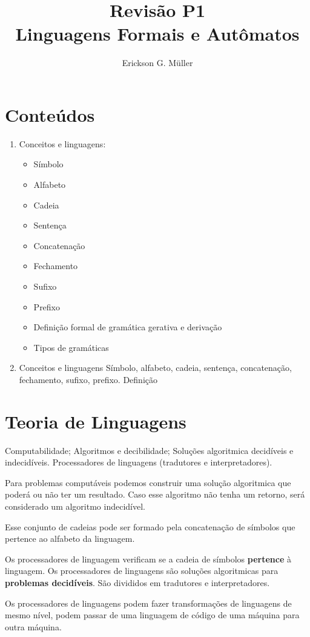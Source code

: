 \documentclass[]{article}
\title{Revisão P1\\Linguagens Formais e Autômatos}
\author{Erickson G. Müller}
\date{}
\begin{document}
	\maketitle
	\section{Conteúdos}
		\begin{enumerate}
			\item Conceitos e linguagens: 
			\begin{itemize}
				\item Símbolo
				\item Alfabeto
				\item Cadeia
				\item Sentença 
				\item Concatenação
				\item Fechamento 
				\item Sufixo
				\item Prefixo
				\item Definição formal de gramática gerativa e derivação
				\item Tipos de gramáticas
			\end{itemize}
			\item Conceitos e linguagens
				Símbolo, alfabeto, cadeia, sentença, concatenação, fechamento, sufixo, prefixo. Definição
		\end{enumerate}
	\section{Teoria de Linguagens}
		Computabilidade; Algoritmos e decibilidade; Soluções algoritmica decidíveis e indecidíveis. Processadores de linguagens (tradutores e interpretadores).
		
		Para problemas computáveis podemos construir uma solução algoritmica que poderá ou não ter um resultado. Caso esse algoritmo não tenha um retorno, será considerado um algoritmo indecidível.
		
		Esse conjunto de cadeias pode ser formado pela concatenação de símbolos que pertence ao alfabeto da linguagem.
		
		Os processadores de linguagem verificam se a cadeia de símbolos \textbf{pertence} à linguagem. Os processadores de linguagens são soluções algoritmicas para \textbf{problemas decidíveis}. São divididos em tradutores e interpretadores.
		
		Os processadores de linguagens podem fazer transformações de linguagens de mesmo nível, podem passar de uma linguagem de código de uma máquina para outra máquina.
		
\end{document}
